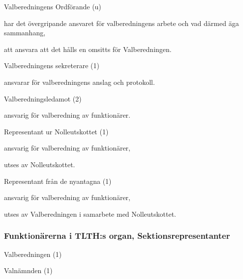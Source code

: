 \documentclass[10pt]{article}
\begin{document}
\begin{emptylist}
    \item Valberedningens Ordförande (u)
        \begin{dashlist}
            \item har det övergripande ansvaret för valberedningens arbete
                och vad därmed äga sammanhang,
            \item att ansvara att det hålls en omsitts för Valberedningen.
        \end{dashlist}
    \item Valberedningens sekreterare (1)
        \begin{dashlist}
            \item ansvarar för valberedningens anslag och protokoll.
        \end{dashlist}
    \item Valberedningsledamot (2)
        \begin{dashlist}
            \item ansvarig för valberedning av funktionärer.
        \end{dashlist}
    \item Representant ur Nolleutskottet (1)
        \begin{dashlist}
            \item ansvarig för valberedning av funktionärer,
            \item utses av Nolleutskottet.
        \end{dashlist}
    \item Representant från de nyantagna (1)
        \begin{dashlist}
            \item ansvarig för valberedning av funktionärer,
            \item utses av Valberedningen i samarbete med Nolleutskottet.
        \end{dashlist}
\end{emptylist}

\subsubsection{Funktionärerna i TLTH:s organ, Sektionsrepresentanter}
\begin{emptylist}
    \item Valberedningen (1)
    \item Valnämnden (1)
\end{emptylist}
\end{document}
